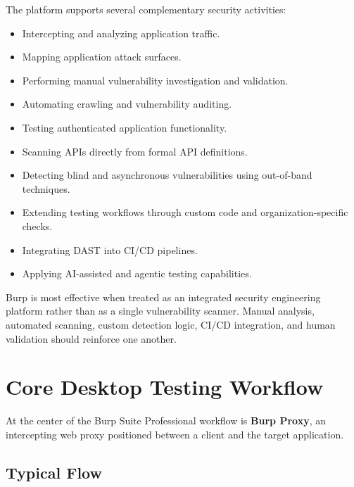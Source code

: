 \documentclass[11pt]{article}
\begin{document}
The platform supports several complementary security activities:

\begin{itemize}
  \item Intercepting and analyzing application traffic.
  \item Mapping application attack surfaces.
  \item Performing manual vulnerability investigation and validation.
  \item Automating crawling and vulnerability auditing.
  \item Testing authenticated application functionality.
  \item Scanning APIs directly from formal API definitions.
  \item Detecting blind and asynchronous vulnerabilities using out-of-band techniques.
  \item Extending testing workflows through custom code and organization-specific checks.
  \item Integrating DAST into CI/CD pipelines.
  \item Applying AI-assisted and agentic testing capabilities.
\end{itemize}

\begin{keypointbox}
Burp is most effective when treated as an integrated security engineering platform rather than as a single vulnerability scanner. Manual analysis, automated scanning, custom detection logic, CI/CD integration, and human validation should reinforce one another.
\end{keypointbox}

\section{Core Desktop Testing Workflow}

At the center of the Burp Suite Professional workflow is \textbf{Burp Proxy}, an intercepting web proxy positioned between a client and the target application.

\subsection{Typical Flow}
\end{document}

